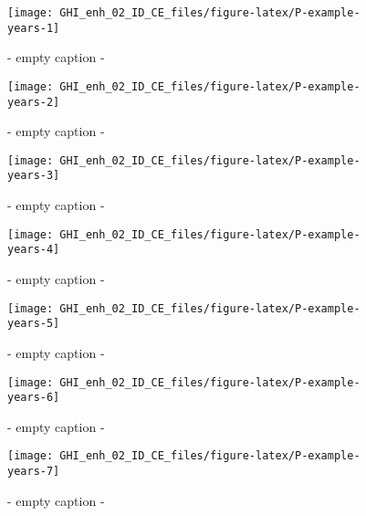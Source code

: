\documentclass[
  10pt,
  a4paper,oneside]{article}
\begin{document}
\begin{figure}[H]

{\centering \texttt{[image: GHI\_enh\_02\_ID\_CE\_files/figure-latex/P-example-years-1]} 

}

\caption{ - empty caption - }\label{fig:P-example-years-1}
\end{figure}
\begin{figure}[H]

{\centering \texttt{[image: GHI\_enh\_02\_ID\_CE\_files/figure-latex/P-example-years-2]} 

}

\caption{ - empty caption - }\label{fig:P-example-years-2}
\end{figure}
\begin{figure}[H]

{\centering \texttt{[image: GHI\_enh\_02\_ID\_CE\_files/figure-latex/P-example-years-3]} 

}

\caption{ - empty caption - }\label{fig:P-example-years-3}
\end{figure}
\begin{figure}[H]

{\centering \texttt{[image: GHI\_enh\_02\_ID\_CE\_files/figure-latex/P-example-years-4]} 

}

\caption{ - empty caption - }\label{fig:P-example-years-4}
\end{figure}
\begin{figure}[H]

{\centering \texttt{[image: GHI\_enh\_02\_ID\_CE\_files/figure-latex/P-example-years-5]} 

}

\caption{ - empty caption - }\label{fig:P-example-years-5}
\end{figure}
\begin{figure}[H]

{\centering \texttt{[image: GHI\_enh\_02\_ID\_CE\_files/figure-latex/P-example-years-6]} 

}

\caption{ - empty caption - }\label{fig:P-example-years-6}
\end{figure}
\begin{figure}[H]

{\centering \texttt{[image: GHI\_enh\_02\_ID\_CE\_files/figure-latex/P-example-years-7]} 

}

\caption{ - empty caption - }\label{fig:P-example-years-7}
\end{figure}
\end{document}
